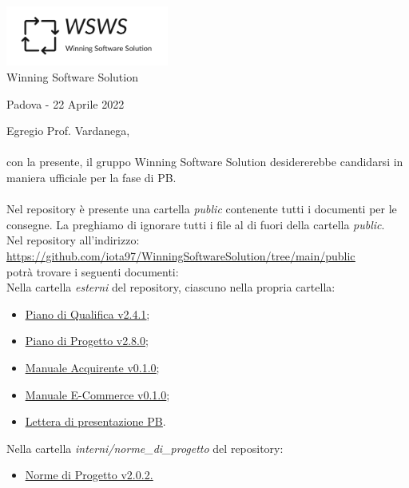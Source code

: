 \documentclass[a4paper, 12pt]{letter}
\begin{document}
\begin{center}
\includegraphics[width=0.4\textwidth]{WSWS-logos_transparent_crop}\\
{\Large Winning Software Solution}\\[24pt]
\end{center}
\begin{flushright}
    Padova - 22 Aprile 2022
\end{flushright}
Egregio Prof. Vardanega,\\\\
con la presente, il gruppo Winning Software Solution desidererebbe candidarsi in maniera ufficiale
per la fase di PB.\\\\
Nel repository è presente una cartella \textit{public} contenente tutti i documenti per le consegne. La preghiamo di ignorare tutti i file
al di fuori della cartella \textit{public}.\\
Nel repository all'indirizzo: \\
\href{https://github.com/iota97/WinningSoftwareSolution/tree/main/public}{\underline{https://github.com/iota97/WinningSoftwareSolution/tree/main/public}}\\ 
potrà trovare i seguenti documenti:\\

Nella cartella \textit{esterni} del repository, ciascuno nella propria cartella:
\begin{itemize}
\item \href{https://github.com/iota97/WinningSoftwareSolution/tree/main/public/esterni/piano_di_qualifica/piano_di_qualifica_v2.4.1.pdf}{\underline{Piano di Qualifica v2.4.1}};
\item \href{https://github.com/iota97/WinningSoftwareSolution/tree/main/public/esterni/piano_di_progetto/piano_di_progetto_v2.8.0.pdf}{\underline{Piano di Progetto v2.8.0}};
\item \href{https://github.com/iota97/WinningSoftwareSolution/tree/main/public/esterni/manuale_acquirente/manuale_acquirente_v0.1.0.pdf}{\underline{Manuale Acquirente v0.1.0}};
\item \href{https://github.com/iota97/WinningSoftwareSolution/tree/main/public/esterni/manuale_e-commerce/manuale_e-commerce_v0.1.0.pdf}{\underline{Manuale E-Commerce v0.1.0}};
\item \href{https://github.com/iota97/WinningSoftwareSolution/tree/main/public/esterni/lettera_pb/lettera_di_presentazione.pdf}{\underline{Lettera di presentazione PB}}.
\end{itemize}
Nella cartella \textit{interni/norme\_di\_progetto} del repository:
\begin{itemize}
    \item \href{https://github.com/iota97/WinningSoftwareSolution/tree/main/public/interni/norme_di_progetto/norme_di_progetto_v2.0.2.pdf}{\underline{Norme di Progetto v2.0.2.}}
\end{itemize}
\end{document}
